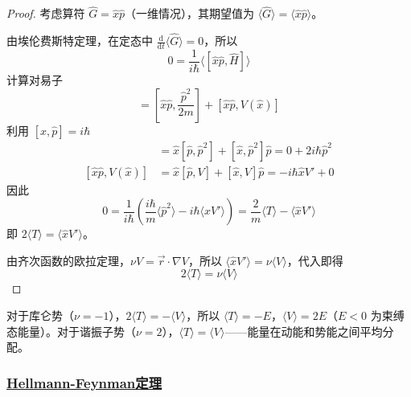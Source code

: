 \begin{proof}
    考虑算符 $\hat{G} = \hat{x}\hat{p}$（一维情况），其期望值为 $\langle \hat{G} \rangle = \langle \hat{x}\hat{p} \rangle$。

    由埃伦费斯特定理，在定态中 $\frac{\mathrm{d}}{\mathrm{d}t}\langle \hat{G} \rangle = 0$，所以
    \begin{equation}
        0 = \frac{1}{i\hbar}\langle [\hat{x}\hat{p}, \hat{H}] \rangle
    \end{equation}
    计算对易子
    \begin{equation}
        [\hat{x}\hat{p}, \hat{H}] = [\hat{x}\hat{p}, \frac{\hat{p}^2}{2m}] + [\hat{x}\hat{p}, V(\hat{x})]
    \end{equation}
    利用 $[\hat{x}, \hat{p}] = i\hbar$
    \begin{align}
        [\hat{x}\hat{p}, \hat{p}^2] &= \hat{x}[\hat{p}, \hat{p}^2] + [\hat{x}, \hat{p}^2]\hat{p} = 0 + 2i\hbar\hat{p}^2 \\
        [\hat{x}\hat{p}, V(\hat{x})] &= \hat{x}[\hat{p}, V] + [\hat{x}, V]\hat{p} = -i\hbar\hat{x}V' + 0
    \end{align}
    因此
    \begin{equation}
        0 = \frac{1}{i\hbar}\left(\frac{i\hbar}{m}\langle \hat{p}^2 \rangle - i\hbar\langle \hat{x}V' \rangle\right) = \frac{2}{m}\langle T \rangle - \langle \hat{x}V' \rangle
    \end{equation}
    即 $2\langle T \rangle = \langle \hat{x}V' \rangle$。

    由齐次函数的欧拉定理，$\nu V = \vec{r}\cdot\nabla V$，所以 $\langle \hat{x}V' \rangle = \nu\langle V \rangle$，代入即得
    \begin{equation}
        2\langle T \rangle = \nu\langle V \rangle
    \end{equation}
\end{proof}

\begin{remark}
    对于库仑势（$\nu = -1$），$2\langle T \rangle = -\langle V \rangle$，所以 $\langle T \rangle = -E$，$\langle V \rangle = 2E$（$E < 0$ 为束缚态能量）。对于谐振子势（$\nu = 2$），$\langle T \rangle = \langle V \rangle$——能量在动能和势能之间平均分配。
\end{remark}

\subsubsection{\protect\hyperlink{:}{Hellmann-Feynman定理}}

